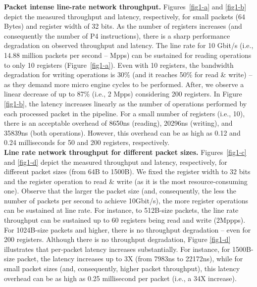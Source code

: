 \noindent \textbf{Packet intense line-rate network throughput.} Figures~\ref{fig1-a} and \ref{fig1-b} depict the measured throughput and latency, respectively, for small packets (64 Bytes) and register width of 32 bits. As the number of registers increases (and consequently the number of P4 instructions), there is a sharp performance degradation on observed throughput and latency. The line rate for 10 Gbit/s (i.e., 14.88 million packets per second -- Mpps) can be sustained for reading operations to only 10 registers (Figure~\ref{fig1-a}). Even with 10 registers, the bandwidth degradation for writing operations is 30\% (and it reaches 50\% for read \& write) -- as they demand more micro engine cycles to be performed. After, we observe a linear decrease of up to 87\% (i.e., 2 Mpps) considering 200 registers. In Figure \ref{fig1-b}, the latency increases linearly as the number of operations performed by each processed packet in the pipeline. For a small number of registers (i.e., 10), there is an acceptable overhead of 8650ns (reading), 20296ns (writing), and 35839ns (both operations). However, this overhead can be as high as 0.12 and 0.24 milliseconds for 50 and 200 registers, respectively.
\\

\noindent \textbf{Line rate network throughput for different packet sizes.} Figures~\ref{fig1-c} and \ref{fig1-d} depict the measured throughput and latency, respectively, for different packet sizes (from 64B to 1500B). We fixed the register width to 32 bits and the register operation to read \& write (as it is the most resource-consuming one). Observe that the larger the packet size (and, consequently, the less the number of packets per second to achieve 10Gbit/s), the more register operations can be sustained at line rate. For instance, to 512B-size packets, the line rate throughput can be sustained up to 60 registers being read and write (2Mppps). For 1024B-size packets and higher, there is no throughput degradation -- even for 200 registers. Although there is no throughput degradation, Figure \ref{fig1-d} illustrates that per-packet latency increases substantially. For instance, for 1500B-size packet, the latency increases up to 3X (from 7983ns to 22172ns), while for small packet sizes (and, consequently, higher packet throughput), this latency overhead can be as high as 0.25 millisecond per packet (i.e., a 34X increase).\\




